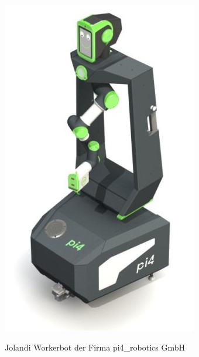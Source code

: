 \begin{minipage}{\textwidth}
    \begin{center}
        \includegraphics[scale=0.5]{img/jolandi.jpg} 
    \end{center}
\end{minipage}
\begin{center}
Jolandi Workerbot der Firma pi4\_robotics GmbH
\end{center}
 
